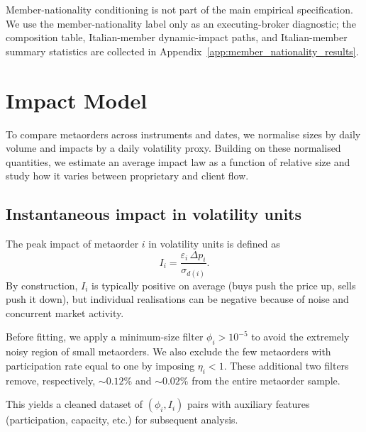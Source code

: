 \documentclass[11pt]{article}
\begin{document}
Member-nationality conditioning is not part of the main empirical specification. We use the member-nationality label only as an executing-broker diagnostic; the composition table, Italian-member dynamic-impact paths, and Italian-member summary statistics are collected in Appendix~\ref{app:member_nationality_results}.

\section{Impact Model}
\label{sec:impact_model}

To compare metaorders across instruments and dates, we normalise sizes by daily volume and impacts by a daily volatility 
proxy. Building on these normalised quantities, we estimate an average impact law as a function of relative size and 
study how it varies between proprietary and client flow.

\subsection{Instantaneous impact in volatility units}

The peak impact of metaorder $i$ in volatility units is
defined as
\begin{equation}
\label{impact_def}
  I_i = \frac{\varepsilon_i\,\Delta p_i}{\sigma_{d(i)}}.
\end{equation}
By construction, $I_i$ is typically positive on average (buys push the
price up, sells push it down), but individual realisations can be
negative because of noise and concurrent market activity.

Before fitting, we apply a minimum-size filter $\phi_i > 10^{-5}$ to avoid the extremely noisy region of small 
metaorders. We also exclude the few metaorders with participation rate equal to one by imposing $\eta_i < 1$. 
These additional two filters remove, respectively,  $\sim 0.12\%$ and $\sim 0.02\%$ from the entire metaorder 
sample.

This yields a cleaned dataset of $(\phi_i, I_i)$ pairs with auxiliary
features (participation, capacity, etc.) for subsequent analysis.


\end{document}
